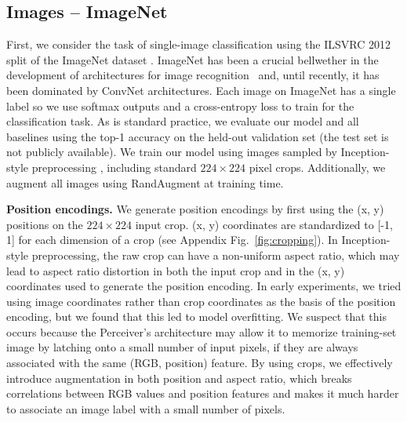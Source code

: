 \subsection{Images -- ImageNet}

First, we consider the task of single-image classification using the ILSVRC 2012 split of the ImageNet dataset \cite{deng2009imagenet}. ImageNet has been a crucial bellwether in the development of architectures for image recognition~\cite{krizhevsky2012imagenet,simonyan2014very,szegedy2015going,he2016deep} and, until recently, it has been dominated by ConvNet architectures. Each image on ImageNet has a single label so we use softmax outputs and a cross-entropy loss to train for the classification task. As is standard practice, we evaluate our model and all baselines using the top-1 accuracy on the held-out validation set (the test set is not publicly available). We train our model using images sampled by Inception-style preprocessing \cite{szegedy2015going}, including standard $224 \times 224$ pixel crops. Additionally, we augment all images using RandAugment \cite{cubuk2020randaugment} at training time.

 \textbf{Position encodings.} We generate position encodings by first using the (x, y) positions on the $224 \times 224$ input crop. (x, y) coordinates are standardized to [-1, 1] for each dimension of a crop (see Appendix Fig.~\ref{fig:cropping}). In Inception-style preprocessing, the raw crop can have a non-uniform aspect ratio, which may lead to aspect ratio distortion in both the input crop and in the (x, y) coordinates used to generate the position encoding. In early experiments, we tried using image coordinates rather than crop coordinates as the basis of the position encoding, but we found that this led to model overfitting. We suspect that this occurs because the Perceiver's architecture may allow it to memorize training-set image by latching onto a small number of input pixels, if they are always associated with the same (RGB, position) feature. By using crops, we effectively introduce augmentation in both position and aspect ratio, which breaks correlations between RGB values and position features and makes it much harder to associate an image label with a small number of pixels.

